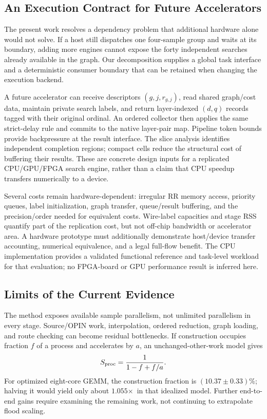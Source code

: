 \documentclass[conference,10pt,letterpaper]{IEEEtran}
\newcommand{\speedup}{\ensuremath{\times}}
\begin{document}
\subsection{An Execution Contract for Future Accelerators}
The present work resolves a dependency problem that additional hardware alone would not solve. If a host still dispatches one four-sample group and waits at its boundary, adding more engines cannot expose the forty independent searches already available in the graph. Our decomposition supplies a global task interface and a deterministic consumer boundary that can be retained when changing the execution backend.

A future accelerator can receive descriptors $(g,j,r_{g,j})$, read shared graph/cost data, maintain private search labels, and return layer-indexed $(d,q)$ records tagged with their original ordinal. An ordered collector then applies the same strict-delay rule and commits to the native layer-pair map. Pipeline token bounds provide backpressure at the result interface. The slice analysis identifies independent completion regions; compact cells reduce the structural cost of buffering their results. These are concrete design inputs for a replicated CPU/GPU/FPGA search engine, rather than a claim that CPU speedup transfers numerically to a device.

Several costs remain hardware-dependent: irregular RR memory access, priority queues, label initialization, graph transfer, queue/result buffering, and the precision/order needed for equivalent costs. Wire-label capacities and stage RSS quantify part of the replication cost, but not off-chip bandwidth or accelerator area. A hardware prototype must additionally demonstrate host/device transfer accounting, numerical equivalence, and a legal full-flow benefit. The CPU implementation provides a validated functional reference and task-level workload for that evaluation; no FPGA-board or GPU performance result is inferred here.

\subsection{Limits of the Current Evidence}
The method exposes available sample parallelism, not unlimited parallelism in every stage. Source/OPIN work, interpolation, ordered reduction, graph loading, and route checking can become residual bottlenecks. If construction occupies fraction $f$ of a process and accelerates by $a$, an unchanged-other-work model gives
\begin{equation}
 S_{\rm proc}=\frac{1}{1-f+f/a}.
\end{equation}
For optimized eight-core GEMM, the construction fraction is $(10.37\pm0.33)\%$; halving it would yield only about $1.055$\speedup\ in that idealized model. Further end-to-end gains require examining the remaining work, not continuing to extrapolate flood scaling.
\end{document}

